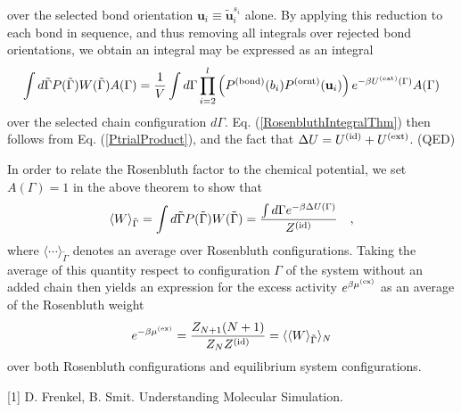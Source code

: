 \documentclass[12pt]{article}
\newcommand{\vv}[1]{\mathbf{#1}}
\newcommand\chain{\Gamma}
\newcommand\delU{\Delta U}
\newcommand\Uid{U^{({\rm id})}}
\newcommand\Uext{U^{({\rm ext})}}
\newcommand\Ztot{Z_{N+1}}
\newcommand\Zsystem{Z_{N}}
\newcommand\Zid{Z^{({\rm id})}}
\newcommand\muex{\mu^{({\rm ex})}}
\newcommand\nbead{l}
\newcommand\ubond{\vv{u}}
\newcommand\rbond{b}
\newcommand\utrial{\tilde{\vv{u}}}
\newcommand\Pbond{P^{({\rm bond})}}
\newcommand\Pornt{P^{({\rm ornt})}}
\newcommand\zid{z^{({\rm id})}}
\newcommand\rconfig{\tilde{\chain}}
\begin{document}
over the selected bond orientation $\ubond_{i} \equiv \utrial_{i}^{s_{i}}$ alone. By applying this reduction to each bond in sequence, and thus removing all integrals over rejected bond orientations, we obtain an integral may be expressed as an integral
\begin{equation}
    \int d\rconfig P(\rconfig)W(\rconfig) A(\chain) = 
    \frac{1}{V} \int d\chain 
    \prod_{i=2}^{\nbead} \left ( \Pbond(\rbond_{i}) \Pornt(\ubond_{i}) \right )
    e^{-\beta\Uext(\chain)} A(\chain) 
\end{equation}
over the selected chain configuration $d\chain$. Eq. (\ref{RosenbluthIntegralThm}) then follows from Eq. (\ref{PtrialProduct}), and the fact that $\delU = \Uid + \Uext$. (QED)


In order to relate the Rosenbluth factor to the chemical potential, we set $A(\chain)=1$
in the above theorem to show that
\begin{equation}
    \langle W \rangle_{\rconfig} = \int d\rconfig P(\rconfig)W(\rconfig) = 
    \frac{\int d\chain e^{-\beta\delU(\chain)}}{\Zid} 
    \quad,
\end{equation}
where $\langle \cdots \rangle_{\rconfig}$ denotes an average over Rosenbluth configurations.
Taking the average of this quantity respect to configuration $\chain$ of the system without 
an added chain then yields an expression for the excess activity $e^{\beta\muex}$ as an 
average of the Rosenbluth weight
\begin{equation}
   e^{-\beta \muex} = 
   \frac{\Ztot (N+1)}{\Zsystem\Zid} = 
   \langle \langle W \rangle_{\rconfig} \rangle_{N}
\end{equation}
over both Rosenbluth configurations and equilibrium system configurations. 


\begin{thebibliography}{99} %

[1] D. Frenkel, B. Smit. Understanding Molecular Simulation. 
 
\end{thebibliography}

\end{document}
